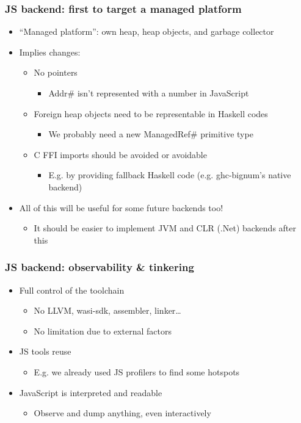 \documentclass{beamer}
\begin{document}
\begin{frame}
\frametitle{JS backend: first to target a managed platform}
\begin{itemize}
\item “Managed platform”: own heap, heap objects, and garbage collector
\item Implies changes:
\begin{itemize}
\item No pointers
\begin{itemize}
\item Addr\# isn’t represented with a number in JavaScript
\end{itemize}
\item Foreign heap objects need to be representable in Haskell codes
\begin{itemize}
\item We probably need a new ManagedRef\# primitive type
\end{itemize}
\item C FFI imports should be avoided or avoidable
\begin{itemize}
\item E.g. by providing fallback Haskell code (e.g. ghc-bignum’s native backend)
\end{itemize}
\end{itemize}
\item All of this will be useful for some future backends too!
\begin{itemize}
\item It should be easier to implement JVM and CLR (.Net) backends after this
\end{itemize}
\end{itemize}
\end{frame}


\begin{frame}
\frametitle{JS backend: observability \& tinkering}

\begin{itemize}
\item Full control of the toolchain 
\begin{itemize}
\item No LLVM, wasi-sdk, assembler, linker…
\item No limitation due to external factors
\end{itemize}
\item JS tools reuse
\begin{itemize}
\item E.g. we already used JS profilers to find some hotspots
\end{itemize}
\item JavaScript is interpreted and readable
\begin{itemize}
\item Observe and dump anything, even interactively
\end{itemize}
\end{itemize}
\end{frame}
\end{document}
